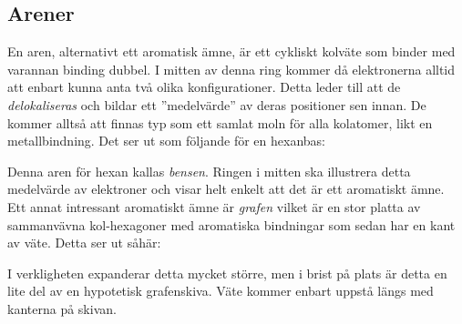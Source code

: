 \subsection{Arener}
En aren, alternativt ett aromatisk ämne, är ett cykliskt kolväte som binder med varannan binding dubbel. I mitten av denna ring kommer då elektronerna alltid att enbart kunna anta två olika konfigurationer. Detta leder till att de \emph{delokaliseras} och bildar ett ''medelvärde'' av deras positioner sen innan. De kommer alltså att finnas typ som ett samlat moln för alla kolatomer, likt en metallbindning. Det ser ut som följande för en hexanbas:
\begin{center}
\end{center}

Denna aren för hexan kallas \emph{bensen}. Ringen i mitten ska illustrera detta medelvärde av elektroner och visar helt enkelt att det är ett aromatiskt ämne. Ett annat intressant aromatiskt ämne är \emph{grafen} vilket är en stor platta av sammanvävna kol-hexagoner med aromatiska bindningar som sedan har en kant av väte. Detta ser ut såhär:
\begin{center}
\end{center}
I verkligheten expanderar detta mycket större, men i brist på plats är detta en lite del av en hypotetisk grafenskiva. Väte kommer enbart uppstå längs med kanterna på skivan.